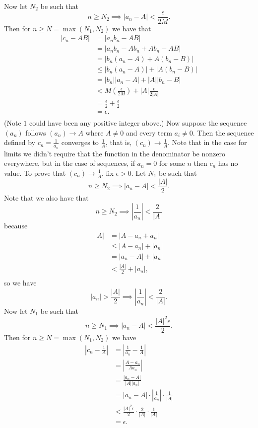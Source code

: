 \documentclass{article}[11pt]
\newcommand{\eps}{\epsilon}
\begin{document}
    Now let $N_2$ be such that
    $$ n \geq N_2 \implies |a_n - A| < \frac{\eps}{2M} .$$
    Then for $n \geq N = \max(N_1, N_2)$ we have that
    \begin{align*}
        |c_n - AB| &= |a_n b_n - AB| \\
                  &= |a_n b_n - A b_n + A b_n - AB| \\
                  &= |b_n(a_n - A) + A(b_n - B)| \\
                  &\leq |b_n(a_n - A)| + |A(b_n - B)| \\
                  &= |b_n| |a_n - A| + |A| |b_n - B| \\
                  &< M\left(\frac{\eps}{2M}\right) + |A| \frac{\eps}{2|A|} \\
                  &= \frac{\eps}{2} + \frac{\eps}{2} \\
                  &= \eps .\\
    \end{align*}
    (Note $1$ could have been any positive integer above.) Now suppose the sequence $(a_n)$ follows $(a_n) \to A$ where $A \neq 0$ and every term $a_i \neq 0$. Then the sequence defined by $c_n = \frac{1}{a_n}$ converges to $\frac{1}{A}$, that is, $(c_n) \to \frac{1}{A}$. Note that in the case for limits we didn't require that the function in the denominator be nonzero everywhere, but in the case of sequences, if $a_n = 0$ for some $n$ then $c_n$ has no value. To prove that $(c_n) \to \frac{1}{A}$, fix $\eps > 0$. Let $N_1$ be such that
    $$ n \geq N_2 \implies |a_n - A| < \frac{|A|}{2} .$$
    Note that we also have that
    $$ n \geq N_2 \implies \left| \frac{1}{a_n} \right| < \frac{2}{|A|} $$
    because
    \begin{align*}
        |A| &= |A - a_n + a_n| \\
            &\leq |A - a_n| + |a_n| \\
            &= |a_n - A| + |a_n| \\
            &< \frac{|A|}{2} + |a_n| ,\\
    \end{align*}
    so we have
    $$ |a_n| > \frac{|A|}{2} \implies \left| \frac{1}{a_n} \right| < \frac{2}{|A|} .$$
    Now let $N_1$ be such that
    $$ n \geq N_1 \implies |a_n - A| < \frac{|A|^2 \eps}{2} .$$
    Then for $n \geq N = \max(N_1, N_2)$ we have
    \begin{align*}
        \left| c_n - \frac{1}{A} \right| &= \left| \frac{1}{a_n} - \frac{1}{A} \right| \\
                             &= \left| \frac{A - a_n}{A a_n} \right| \\
                             &= \frac{|a_n - A|}{|A| |a_n|} \\
                             &= |a_n - A| \cdot \left| \frac{1}{a_n} \right| \cdot \frac{1}{|A|} \\
                             &< \frac{|A|^2 \eps}{2} \cdot \frac{2}{|A|} \cdot \frac{1}{|A|} \\
                             &= \eps .\\
    \end{align*}
\end{document}
